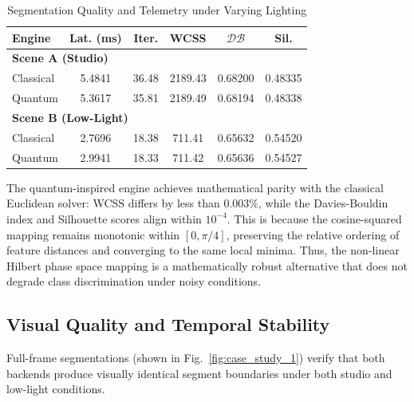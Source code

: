 \begin{table}[t]
\centering
\footnotesize
\caption{Segmentation Quality and Telemetry under Varying Lighting}
\label{tab:quality_metrics}
\setlength{\tabcolsep}{4pt}
\begin{tabular}{lccccc}
\hline
\textbf{Engine} & \textbf{Lat. (ms)} & \textbf{Iter.} & \textbf{WCSS} & \textbf{$\mathcal{D}\mathcal{B}$} & \textbf{Sil.} \\ \hline
\multicolumn{6}{l}{\textbf{Scene A (Studio)}} \\
\quad Classical & 5.4841 & 36.48 & 2189.43 & 0.68200 & 0.48335 \\
\quad Quantum   & 5.3617 & 35.81 & 2189.49 & 0.68194 & 0.48338 \\ \hline
\multicolumn{6}{l}{\textbf{Scene B (Low-Light)}} \\
\quad Classical & 2.7696 & 18.38 & 711.41  & 0.65632 & 0.54520 \\
\quad Quantum   & 2.9941 & 18.33 & 711.42  & 0.65636 & 0.54527 \\ \hline
\end{tabular}
\end{table}

The quantum-inspired engine achieves mathematical parity with the classical Euclidean solver: WCSS differs by less than $0.003\%$, while the Davies-Bouldin index and Silhouette scores align within $10^{-4}$. This is because the cosine-squared mapping remains monotonic within $[0, \pi/4]$, preserving the relative ordering of feature distances and converging to the same local minima. Thus, the non-linear Hilbert phase space mapping is a mathematically robust alternative that does not degrade class discrimination under noisy conditions.

\subsection{Visual Quality and Temporal Stability}
Full-frame segmentations (shown in Fig.~\ref{fig:case_study_1}) verify that both backends produce visually identical segment boundaries under both studio and low-light conditions.

